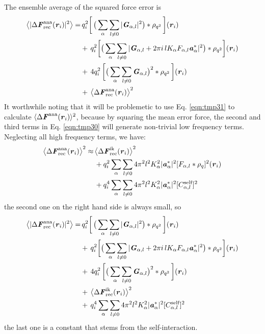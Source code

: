 \documentclass[aps,pre,preprint]{revtex4}
\renewcommand{\v}[1]{\textbf{\textit{#1}}}
\begin{document}
The ensemble average of the squared force error is
\begin{align}\nonumber
  \big\langle
  \vert \Delta\v F_{\textrm{rec}}^{\textrm{ana}}(\v r_i)\vert^2
  \big\rangle
  =&\,
  q_i^2
  \bigg[\,
  \big(
  \sum_{\alpha} \sum_{l\neq 0}
  \vert \v G_{\alpha,l}\vert^2
  \big)
  \ast \rho_{q^2}
  \,\bigg] (\v r_i)\\\nonumber
  & +\,
  q_i^2
  \bigg[
  \big(
  \sum_{\alpha}\sum_{l\neq 0}
  \vert
  \v G_{\alpha,l} + 2\pi i\,l K_\alpha F_{\alpha,l} \v a_\alpha^\ast\vert^2
  \big)
  \ast \rho_{q^2}
  \bigg]
  (\v r_i) \\\nonumber
  & +\,
  4q_i^2\,
  \bigg[
  \big(
  \sum_{\alpha} \sum_{l\neq 0}  
  \v G_{\alpha,l}
  \big)^2
  \ast \rho_{q^2}\,
  \bigg] (\v r_i) \\
  & +\,
  \big\langle \Delta\v F_{\textrm{rec}}^{\textrm{ana}}(\v r_i)\big\rangle ^2
\end{align}
It worthwhile noting that it will be problemetic to use
Eq. \eqref{eqn:tmp31} to calculate $\langle \Delta\v F^{\textrm{ana}}(\v r_i)\rangle
^2$, because by squaring the mean error force, the second and third
terms in Eq. \eqref{eqn:tmp30} will generate non-trivial low frequency
terms. Neglecting all high frequency terms, we have:
\begin{align}\nonumber
  \big\langle \Delta\v F_{\textrm{rec}}^{\textrm{ana}}(\v r_i)\big\rangle ^2
  \approx&\,
  \big\langle \Delta\v F_{\textrm{rec}}^{\textrm{ik}}(\v r_i)\big\rangle ^2 \\\nonumber
  &\,
  +q_i^2 \sum_{\alpha}\sum_{l\neq 0}
  4\pi^2l^2K_\alpha^2\vert\v a_{\alpha}^\ast\vert^2[F_{\alpha,l}\ast\rho_q]^2 (\v r_i) \\
  &\,
  +q_i^4 \sum_{\alpha}\sum_{l\neq 0}
  4\pi^2l^2K_\alpha^2\vert\v a_{\alpha}^\ast\vert^2[C_{\alpha,l}^{\textrm{self}}]^2 
\end{align}
the second one on the right hand side is always small, so
\begin{align}\nonumber
  \big\langle
  \vert \Delta\v F_{\textrm{rec}}^{\textrm{ana}}(\v r_i)\vert^2
  \big\rangle
  =&\,
  q_i^2
  \bigg[\,
  \big(
  \sum_{\alpha} \sum_{l\neq 0}
  \vert \v G_{\alpha,l}\vert^2
  \big)
  \ast \rho_{q^2}
  \,\bigg] (\v r_i) \\\nonumber
  & +\,
  q_i^2
  \bigg[
  \big(
  \sum_{\alpha}\sum_{l\neq 0}
  \vert
  \v G_{\alpha,l} + 2\pi i\,l K_\alpha F_{\alpha,l} \v a_\alpha^\ast\vert^2
  \big)
  \ast \rho_{q^2}
  \bigg]
  (\v r_i) \\ \nonumber
  & +\,
  4q_i^2\,
  \bigg[
  \big(
  \sum_{\alpha} \sum_{l\neq 0}  
  \v G_{\alpha,l}
  \big)^2
  \ast \rho_{q^2}\,
  \bigg] (\v r_i) \\\nonumber
  & +\,
  \big\langle \Delta\v F_{\textrm{rec}}^{\textrm{ik}}(\v r_i)\big\rangle ^2\\
  &+\,
  q_i^4 \sum_{\alpha}\sum_{l\neq 0}
  4\pi^2l^2K_\alpha^2\vert\v a_{\alpha}^\ast\vert^2[C_{\alpha,l}^{\textrm{self}}]^2 
\end{align}
the last one is a constant that stems from the self-interaction.
\end{document}
